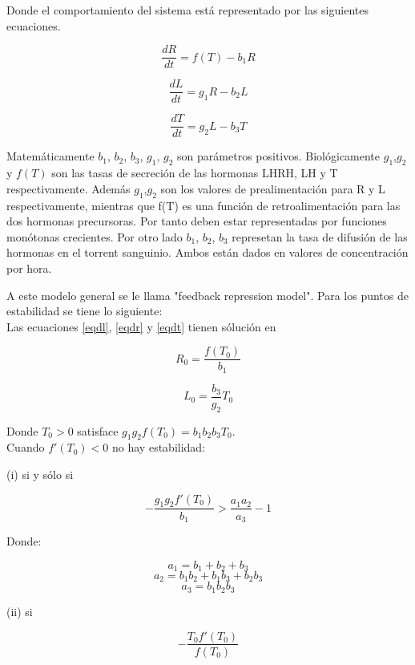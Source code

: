 \documentclass[letter,11pt]{article}
\begin{document}
Donde el comportamiento del sistema está representado por las siguientes ecuaciones.

\begin{equation}
\frac{dR}{dt} = f(T)-b_{1}R
\label{eqdr}
\end{equation}

\begin{equation}
\frac{dL}{dt} = g_{1}R-b_{2}L
\label{eqdl}
\end{equation}

\begin{equation}
 \frac{dT}{dt} = g_{2}L-b_{3}T 
 \label{eqdt}
\end{equation}


Matemáticamente $b_{1}$, $b_{2}$, $b_{3}$, $g_{1}$, $g_{2}$ son parámetros positivos. Biológicamente $g_{1}$,$g_{2}$ y $f(T)$ son las tasas de secreción de las hormonas LHRH, LH y T respectivamente. Además  $g_{1}$,$g_{2}$ son los valores de prealimentación para R y L respectivamente, mientras que f(T) es una función de retroalimentación para las dos hormonas precursoras. Por tanto deben estar representadas por funciones monótonas crecientes. Por otro lado $b_{1}$, $b_{2}$, $b_{3}$ represetan la tasa de difusión de las hormonas en el torrent sanguinio. Ambos están dados en valores de concentración por hora.

A este modelo general se le llama "feedback repression model". Para los puntos de estabilidad se tiene lo siguiente:\\

Las ecuaciones \ref{eqdl}, \ref{eqdr} y \ref{eqdt} tienen sólución en

$$R_{0} = \frac{f(T_{0})}{b_{1}}$$

$$L_{0} = \frac{b_{3}}{g_{2}}T_{0}$$

Donde $T_{0}>0$ satisface $g_{1}g_{2}f(T_{0}) = b_{1}b_{2}b_{3}T_{0}.$\\

Cuando $f'(T_{0}) < 0$ no hay estabilidad: 

(i) si y sólo si 

$$-\frac{g_{1}g_{2}f'(T_{0})}{b_{1}} > \frac{a_{1}a_{2}}{a_{3}}-1$$

Donde:

$$a_{1} = b_{1}+b_{2}+b_{3}$$
$$a_{2}=b_{1}b_{2}+b_{1}b_{3}+b_{2}b_{3}$$
$$a_{3}=b_{1}b_{2}b_{3}$$

(ii) si 

$$-\frac{T_{0}f'(T_{0})}{f(T_{0})}$$\\
\end{document}
